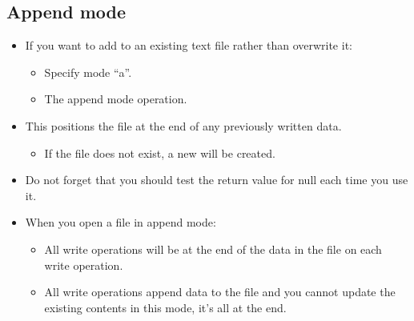 \subsection{Append mode}
\begin{itemize}
    \item If you want to add to an existing text file rather than overwrite it:
        \begin{itemize}
            \item Specify mode ``a''.
            \item The append mode operation. 
        \end{itemize}
    
    \item This positions the file at the end of any previously written data.
        \begin{itemize}
            \item If the file does not exist, a new will be created.
        \end{itemize}
    
    \item Do not forget that you should test the return value for null each time you use it.
    \item When you open a file in append mode:
        \begin{itemize}
            \item All write operations will be at the end of the data in the file on each write operation.
            \item All write operations append data to the file and you cannot update the existing contents in this mode, it's all at the end.    
        \end{itemize}
\end{itemize}

